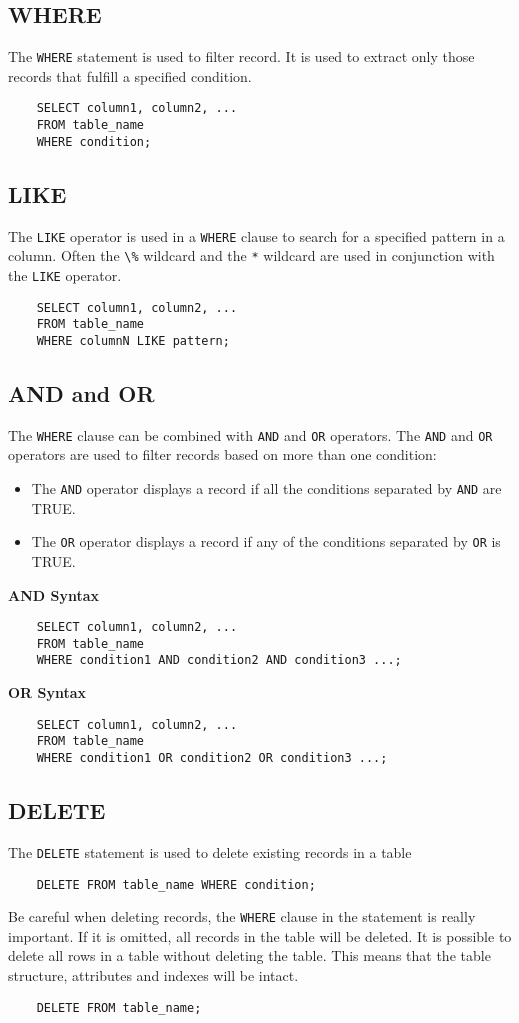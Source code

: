\documentclass{thomasClass}
\begin{document}
\subsection{WHERE}
The \verb|WHERE| statement is used to filter record. It is used to extract only those records that fulfill a specified condition.
\begin{verbatim}
    SELECT column1, column2, ...
    FROM table_name
    WHERE condition;
\end{verbatim}
\subsection{LIKE}
The \verb|LIKE| operator is used in a \verb|WHERE| clause to search for a specified pattern in a column. Often the \verb|\%| wildcard and the \verb|*| wildcard are used in conjunction with the \verb|LIKE| operator.
\begin{verbatim}
    SELECT column1, column2, ...
    FROM table_name
    WHERE columnN LIKE pattern;
\end{verbatim}

\subsection{AND and  OR}
The \verb|WHERE| clause can be combined with \verb|AND| and \verb|OR| operators. The \verb|AND| and \verb|OR| operators are used to filter records based on more than one condition:
\begin{itemize}
    \item The \verb|AND| operator displays a record if all the conditions separated by \verb|AND| are TRUE.
    \item The \verb|OR| operator displays a record if any of the conditions separated by \verb|OR| is TRUE.
\end{itemize}
\textbf{AND Syntax}
\begin{verbatim}
    SELECT column1, column2, ...
    FROM table_name
    WHERE condition1 AND condition2 AND condition3 ...;
\end{verbatim}
\textbf{OR Syntax}
\begin{verbatim}
    SELECT column1, column2, ...
    FROM table_name
    WHERE condition1 OR condition2 OR condition3 ...;
\end{verbatim}

\subsection{DELETE}
The \verb|DELETE| statement is used to delete existing records in a table
\begin{verbatim}
    DELETE FROM table_name WHERE condition;
\end{verbatim}
Be careful when deleting records, the \verb|WHERE| clause in the statement is really important. If it is omitted, all records in the table will be deleted. \newline
\noindent It is possible to delete all rows in a table without deleting the table. This means that the table structure, attributes and indexes will be intact.
\begin{verbatim}
    DELETE FROM table_name;
\end{verbatim}
\end{document}
